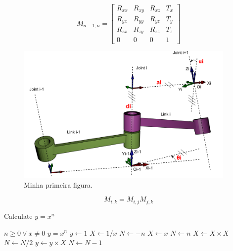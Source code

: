 \begin{equation}
M_{n-1,n} =  \left[ \begin{array}{ccc|c} R_{xx} & R_{xy} & R_{xz} & T_x \\ R_{yx} & R_{yy} & R_{yz} & T_y \\ R_{zx} & R_{zy} & R_{zz} & T_z \\
\hline
0 & 0 & 0 & 1 \end{array}\right]
\end{equation}

\begin{figure}[htbp]
    \centering
        \includegraphics[width=0.95\textwidth]{imagens/dh.png}
    \caption{Minha primeira figura.}
    \label{fig:Figura1}
\end{figure}

\begin{equation}
M_{i,k}= M_{i,j} M_{j,k}
\end{equation}


\begin{algorithm}[H]
\caption{Calculate $y = x^n$}
\begin{algorithmic}
\REQUIRE $n \geq 0 \vee x \neq 0$
\ENSURE $y = x^n$
\STATE $y \leftarrow 1$
\STATE $X \leftarrow 1 / x$
\STATE $N \leftarrow -n$
\ELSE
\STATE $X \leftarrow x$
\STATE $N \leftarrow n$
\ENDIF
{}
\STATE $X \leftarrow X \times X$
\STATE $N \leftarrow N / 2$
\ELSE[$N$ is odd]
\STATE $y \leftarrow y \times X$
\STATE $N \leftarrow N - 1$
\ENDIF
\ENDWHILE
\end{algorithmic}
\end{algorithm}